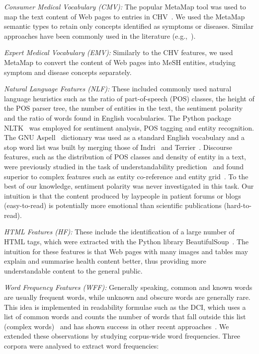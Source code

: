 \documentclass[10pt,a4paper]{article}
\begin{document}
\textit{Consumer Medical Vocabulary (CMV):}
The popular MetaMap \cite{aronson10} tool was used to map the text content of Web pages to entries in  CHV~\cite{zeng06}.
We used the MetaMap semantic types to retain only concepts identified as symptoms or diseases. Similar approaches have been commonly used in the literature (e.g.,~\cite{pang16,agrafiotesA16,palotti16,yates13}).

\textit{Expert Medical Vocabulary (EMV):}
Similarly to the CHV features, we used MetaMap to convert the content of Web pages into MeSH entities, studying symptom and disease concepts separately. 

\textit{Natural Language Features (NLF):}
These included commonly used natural language heuristics such as the ratio of part-of-speech (POS) classes, the height of the POS parser tree, the number of entities in the text, 
the sentiment polarity~\cite{pang08} and the ratio of words found in English vocabularies. The Python package NLTK~\cite{nltk} was employed for sentiment analysis, POS tagging and entity recognition. The GNU Aspell~\cite{aspell} dictionary was used as a standard English vocabulary and a stop word list was built by merging those of Indri~\cite{indri} and Terrier~\cite{terrier}. 
Discourse features, such as the distribution of POS classes and density of entity in a text, were previously studied in the task of understandability prediction~\cite{feng10} and found superior to complex features such as entity co-reference and entity grid~\cite{barzilay08}. To the best of our knowledge, sentiment polarity was never investigated in this task. Our intuition is that the content produced by laypeople in patient forums or blogs (easy-to-read) is potentially more emotional than scientific publications (hard-to-read).

\textit{HTML Features (HF):}
These include the identification of a large number of HTML tags, which were extracted with the Python library BeautifulSoup~\cite{bs4}. The intuition for these features is that Web pages with many images and tables may explain and summarise health content better, thus providing more understandable content to the general public. 

\textit{Word Frequency Features (WFF):}
Generally speaking, common and known words are usually frequent words, while unknown and obscure words are generally rare. This idea is implemented in readability formulae such as the DCI, which uses a list of common words and counts the number of words that fall outside this list (complex words)~\cite{dale48} and has shown success in other recent approaches~\cite{elhadad06,wu15}.
We extended these observations by studying corpus-wide word frequencies. 
Three corpora were analysed to extract word frequencies:
\end{document}
